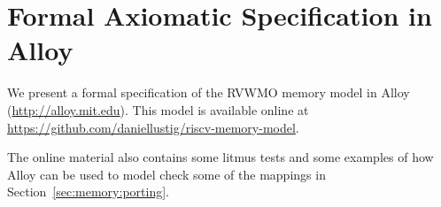 \section{Formal Axiomatic Specification in Alloy}
\label{sec:alloy}

\lstset{language=alloy}
\lstset{aboveskip=0pt}
\lstset{belowskip=0pt}

We present a formal specification of the RVWMO memory model in Alloy (\url{http://alloy.mit.edu}).
This model is available online at \url{https://github.com/daniellustig/riscv-memory-model}.

The online material also contains some litmus tests and some examples of how Alloy can be used to model check some of the mappings in Section~\ref{sec:memory:porting}.

